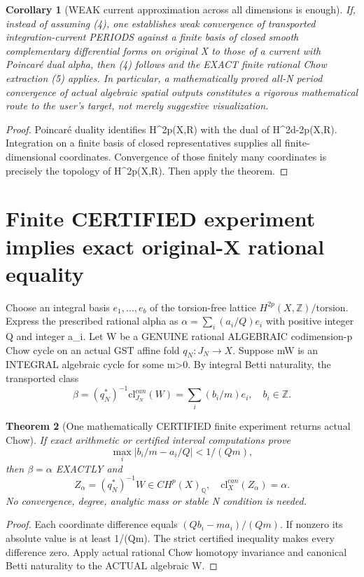 \documentclass[11pt]{article}
\newtheorem{theorem}{Theorem}[section]
\newtheorem{corollary}[theorem]{Corollary}
\begin{document}
\begin{corollary}[WEAK current approximation across all dimensions is enough]
If, instead of assuming (4),
one establishes weak convergence
of transported integration-current
PERIODS against a finite basis
of closed smooth complementary
differential forms on original X
to those of a current with
Poincaré dual alpha, then (4)
follows and the EXACT
finite rational Chow extraction
(5) applies.
In particular, a mathematically
proved all-N period convergence
of actual algebraic spatial
outputs constitutes a rigorous
mathematical route to the
user's target, not merely
suggestive visualization.
\end{corollary}
\begin{proof}
Poincaré duality identifies
H^{2p}(X,R) with the dual
of H^{2d-2p}(X,R).
Integration on a finite
basis of closed
representatives supplies
all finite-dimensional
coordinates. Convergence
of those finitely many
coordinates is precisely
the topology of
H^{2p}(X,R).
Then apply the theorem.
\end{proof}

\section{Finite CERTIFIED experiment implies exact original-X rational equality}
Choose an integral basis $e_1,\ldots,e_b$ of the torsion-free
lattice $H^{2p}(X,\mathbb Z)/\mathrm{torsion}$.
Express the prescribed rational alpha as
$\alpha=\sum_i(a_i/Q)e_i$ with positive integer Q and integer a_i.
Let W be a GENUINE rational ALGEBRAIC codimension-p Chow
cycle on an actual GST affine fold $q_N:J_N\to X$.
Suppose mW is an INTEGRAL algebraic cycle for some m>0.
By integral Betti naturality, the transported class
\[
 \beta=(q_N^*)^{-1}\mathrm{cl}^{can}_{J_N}(W)
       =\sum_i (b_i/m)e_i,\quad b_i\in\mathbb Z .
\]

\begin{theorem}[One mathematically CERTIFIED finite experiment returns actual Chow]
If exact arithmetic or certified interval computations prove
\[
 \boxed{\max_i |b_i/m-a_i/Q|<1/(Qm),}                 \tag{18}
\]
then $\beta=\alpha$ EXACTLY and
\[
 \boxed{Z_\alpha=(q_N^*)^{-1}W\in CH^p(X)_\mathbb Q,
        \quad\mathrm{cl}^{can}_X(Z_\alpha)=\alpha.}  \tag{19}
\]
No convergence, degree, analytic mass or stable N condition is needed.
\end{theorem}
\begin{proof}
Each coordinate difference equals $(Qb_i-ma_i)/(Qm)$.
If nonzero its absolute value is at least 1/(Qm).
The strict certified inequality makes every difference zero.
Apply actual rational Chow homotopy invariance and canonical
Betti naturality to the ACTUAL algebraic W.
\end{proof}
\end{document}
